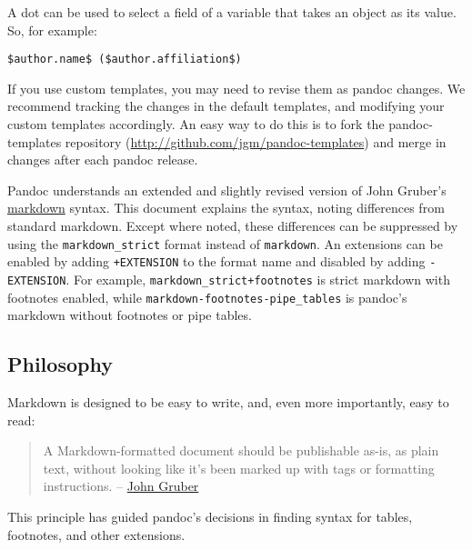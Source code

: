 \documentclass[]{article}
\begin{document}
A dot can be used to select a field of a variable that takes an object
as its value. So, for example:

\begin{verbatim}
$author.name$ ($author.affiliation$)
\end{verbatim}

If you use custom templates, you may need to revise them as pandoc
changes. We recommend tracking the changes in the default templates, and
modifying your custom templates accordingly. An easy way to do this is
to fork the pandoc-templates repository
(\url{http://github.com/jgm/pandoc-templates}) and merge in changes
after each pandoc release.


Pandoc understands an extended and slightly revised version of John
Gruber's \href{http://daringfireball.net/projects/markdown/}{markdown}
syntax. This document explains the syntax, noting differences from
standard markdown. Except where noted, these differences can be
suppressed by using the \texttt{markdown\_strict} format instead of
\texttt{markdown}. An extensions can be enabled by adding
\texttt{+EXTENSION} to the format name and disabled by adding
\texttt{-EXTENSION}. For example, \texttt{markdown\_strict+footnotes} is
strict markdown with footnotes enabled, while
\texttt{markdown-footnotes-pipe\_tables} is pandoc's markdown without
footnotes or pipe tables.

\subsection{Philosophy}\label{philosophy}

Markdown is designed to be easy to write, and, even more importantly,
easy to read:

\begin{quote}
A Markdown-formatted document should be publishable as-is, as plain
text, without looking like it's been marked up with tags or formatting
instructions. --
\href{http://daringfireball.net/projects/markdown/syntax\#philosophy}{John
Gruber}
\end{quote}

This principle has guided pandoc's decisions in finding syntax for
tables, footnotes, and other extensions.
\end{document}
